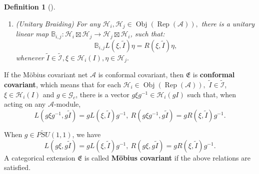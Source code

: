 \documentclass{article}
\newtheorem{definition}{Definition}
\newcommand{\hilb}{\mathcal{H}}
\newcommand{\A}{\mathcal{A}}
\begin{document}
\begin{definition}[\cite{gui2021categorical}]
\begin{enumerate}[A]
        $\widetilde{I}$ is anticlockwise to $\widetilde{J}$ and any $\xi\in\hilb_i(I), \eta\in\hilb_j(J)$, the following diagram commutes adjointly:
        \[
        \begin{tikzcd}
            \hilb_k \arrow{r}{R(\eta,\widetilde{J})} \arrow[swap]{d}{L(\xi,\widetilde{I})}    &\hilb_k\boxtimes \hilb_j \arrow{d}{L(\xi,\widetilde{I})} \\
            \hilb_i\boxtimes\hilb_k     \arrow{r}{R(\eta,\widetilde{J})}      & \hilb_i\boxtimes\hilb_k\boxtimes\hilb_j
        \end{tikzcd}
        \]
        \item (Unitary Braiding) For any $\hilb_i, \hilb_j \in \operatorname{Obj}(\operatorname{Rep}(\A)) ,$ there is a unitary linear map $\mathbb{B}_{i,j}: \hilb_i\boxtimes\hilb_j \to \hilb_j\boxtimes\hilb_i$, such that:
        \[
        \mathbb{B}_{i,j}L(\xi,\widetilde{I})\eta = R(\xi,\widetilde{I})\eta, 
        \]
        whenever $\widetilde{I}\in\widetilde{\mathcal{I}}, \xi\in\hilb_i(I), \eta\in \hilb_j. $
        
    
    \end{enumerate}

\end{definition}

If the M\"{o}bius covariant net $\A$ is conformal covariant, then $\mathfrak{E}$ is \textbf{conformal covariant}, which means that  for each $\hilb_i \in \operatorname{Obj}(\operatorname{Rep}(\A)),$
$\widetilde{I} \in \widetilde{\mathcal{I}}$, $\xi\in \hilb_i(I)$ and $g\in \mathcal{G}_c$, 
there is  a  vector $g\xi g^{-1} \in \hilb_i(gI)$ such that, when acting on any $\A$-module, 
\[
L(g\xi g^{-1} , g\widetilde{I})= g L(\xi, \widetilde{I}) g^{-1}, \ R(g\xi g^{-1} , g\widetilde{I})= g R(\xi, \widetilde{I}) g^{-1}.
\]

When $g\in \widetilde{PSU}(1,1)$, we have 
\[
L(g\xi  , g\widetilde{I})= g L(\xi, \widetilde{I}) g^{-1}, \ R(g\xi  , g\widetilde{I})= g R(\xi, \widetilde{I}) g^{-1}.
\]
A categorical extension $\mathfrak{E}$ is called  \textbf{M\"{o}bius covariant} if the above relations are satisfied. 
\end{document}
